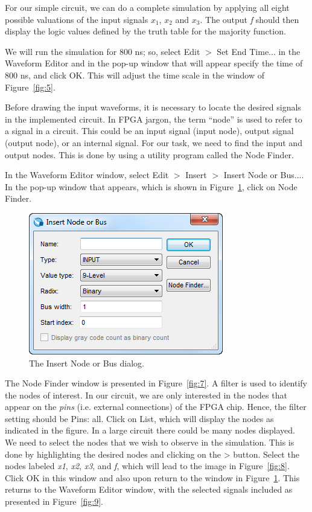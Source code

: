 \documentclass[11pt, twoside, pdftex]{article}
\begin{document}
For our simple circuit, we can do a complete simulation by applying all eight possible valuations of the 
input signals $x_1$, $x_2$ and $x_3$. 
The output {\it f} should then display the logic values defined by
the truth table for the majority function.

We will run the simulation for 800 ns; so, select {\sf Edit $>$ Set End Time...} in the
Waveform Editor and in the
pop-up window that will appear specify the time of 800 ns, and click {\sf OK}. 
This will adjust the time scale in the window of Figure~\ref{fig:5}.  

Before drawing the input waveforms, it is necessary to locate the desired signals in the
implemented circuit. In FPGA jargon, the term ``node'' is used to refer to a signal in 
a circuit. This could be an input signal (input node), output signal (output node), or
an internal signal. For our task, we need to find the input and output nodes. This is done
by using a utility program called the Node Finder.

In the Waveform Editor window, select {\sf Edit $>$ Insert $>$ Insert Node or Bus...}. In the
pop-up window that appears, which is shown in Figure~\ref{fig:6}, click on {\sf Node Finder}.
~\\

\begin{figure}[H]
   \begin{center}
      \includegraphics[scale=0.7]{figures/figure6.png}
   \caption{The Insert Node or Bus dialog.} 
	 \label{fig:6}
	 \end{center}
\end{figure}

The Node Finder window is presented in Figure~\ref{fig:7}. A filter is used to identify the nodes of interest.
In our circuit, we are only interested in the nodes that appear on the {\it pins} (i.e. external
connections) of the FPGA chip. Hence, the filter setting should be {\sf Pins: all}. Click on
{\sf List}, which will display the nodes as indicated in the figure. In a large circuit there could 
be many nodes displayed. We need to select the nodes that we wish to observe in the simulation.
This is done by highlighting the desired nodes and clicking on the {\sf >} button. Select the nodes
labeled {\it x1}, {\it x2}, {\it x3}, and {\it f}, which will lead to the image in Figure~\ref{fig:8}.
Click {\sf OK} in this window and also upon return to the window in Figure~\ref{fig:6}. This returns to
the Waveform Editor window, with the selected signals included as presented in Figure~\ref{fig:9}.
\end{document}

